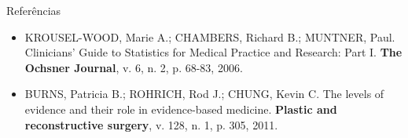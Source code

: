 \documentclass{beamer}
\begin{document}
\begin{frame}{Referências}
  \begin{itemize}
    \tiny
  \item KROUSEL-WOOD, Marie A.; CHAMBERS, Richard B.; MUNTNER, Paul. Clinicians' Guide to Statistics for Medical Practice and Research: Part I. {\bf The Ochsner Journal}, v. 6, n. 2, p. 68-83, 2006.
  \item BURNS, Patricia B.; ROHRICH, Rod J.; CHUNG, Kevin C. The levels of evidence and their role in evidence-based medicine. {\bf Plastic and reconstructive surgery}, v. 128, n. 1, p. 305, 2011.
  \end{itemize}
\end{frame}







\end{document}
